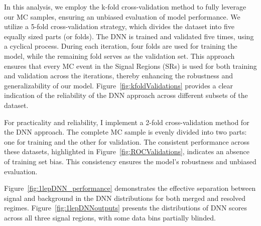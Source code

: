 In this analysis, we employ the k-fold cross-validation method to fully leverage our MC samples, ensuring an unbiased evaluation of model performance. We utilize a 5-fold cross-validation strategy, which divides the dataset into five equally sized parts (or folds). The DNN is trained and validated five times, using a cyclical process. During each iteration, four folds are used for training the model, while the remaining fold serves as the validation set. This approach ensures that every MC event in the Signal Regions (SRs) is used for both training and validation across the iterations, thereby enhancing the robustness and generalizability of our model. Figure~\ref{fig:kfoldValidations} provides a clear indication of the reliability of the DNN approach across different subsets of the dataset.

For practicality and reliability, I implement a 2-fold cross-validation method for the DNN approach. The complete MC sample is evenly divided into two parts: one for training and the other for validation. 
The consistent performance across these datasets, highlighted in Figure~\ref{fig:ROCValidations}, indicates an absence of training set bias. This consistency ensures the model's robustness and unbiased evaluation.

Figure~\ref{fig:1lepDNN_performance} demonstrates the effective separation between signal and background in the DNN distributions for both merged and resolved regimes. Figure~\ref{fig:1lepDNNoutputs} presents the distributions of DNN scores across all three signal regions, with some data bins partially blinded.


